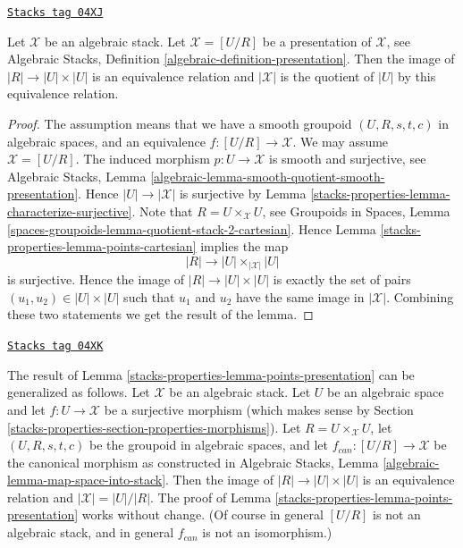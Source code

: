 \begin{lemma}
\label{stacks-properties-lemma-points-presentation}
\href{https://stacks.math.columbia.edu/tag/04XJ}{\texttt{Stacks tag 04XJ}}

Let $\mathcal{X}$ be an algebraic stack.
Let $\mathcal{X} = [U/R]$ be a presentation of $\mathcal{X}$, see
Algebraic Stacks, Definition \ref{algebraic-definition-presentation}.
Then the image of $|R| \to |U| \times |U|$ is an equivalence relation
and $|\mathcal{X}|$ is the quotient of $|U|$ by this equivalence relation.
\end{lemma}

\begin{proof}
The assumption means that we have a smooth groupoid $(U, R, s, t, c)$
in algebraic spaces, and an equivalence $f : [U/R] \to \mathcal{X}$.
We may assume $\mathcal{X} = [U/R]$.
The induced morphism $p : U \to \mathcal{X}$ is smooth and surjective, see
Algebraic Stacks,
Lemma \ref{algebraic-lemma-smooth-quotient-smooth-presentation}.
Hence $|U| \to |\mathcal{X}|$ is surjective by
Lemma \ref{stacks-properties-lemma-characterize-surjective}.
Note that $R = U \times_\mathcal{X} U$, see
Groupoids in Spaces,
Lemma \ref{spaces-groupoids-lemma-quotient-stack-2-cartesian}.
Hence
Lemma \ref{stacks-properties-lemma-points-cartesian}
implies the map
$$
|R| \longrightarrow |U| \times_{|\mathcal{X}|} |U|
$$
is surjective. Hence the image of $|R| \to |U| \times |U|$ is
exactly the set of pairs $(u_1, u_2) \in |U| \times |U|$
such that $u_1$ and $u_2$ have the same image in $|\mathcal{X}|$.
Combining these two statements we get the result of the lemma.
\end{proof}

\begin{remark}
\label{stacks-properties-remark-more-general-presentation}
\href{https://stacks.math.columbia.edu/tag/04XK}{\texttt{Stacks tag 04XK}}

The result of
Lemma \ref{stacks-properties-lemma-points-presentation}
can be generalized as follows.
Let $\mathcal{X}$ be an algebraic stack.
Let $U$ be an algebraic space and let $f : U \to \mathcal{X}$ be a surjective
morphism (which makes sense by
Section \ref{stacks-properties-section-properties-morphisms}).
Let $R = U \times_\mathcal{X} U$, let $(U, R, s, t, c)$ be the groupoid
in algebraic spaces, and let $f_{can} : [U/R] \to \mathcal{X}$ be the
canonical morphism as constructed in
Algebraic Stacks, Lemma \ref{algebraic-lemma-map-space-into-stack}.
Then the image of $|R| \to |U| \times |U|$ is an equivalence relation
and $|\mathcal{X}| = |U|/|R|$. The proof of
Lemma \ref{stacks-properties-lemma-points-presentation}
works without change. (Of course in general $[U/R]$ is not an algebraic
stack, and in general $f_{can}$ is not an isomorphism.)
\end{remark}

